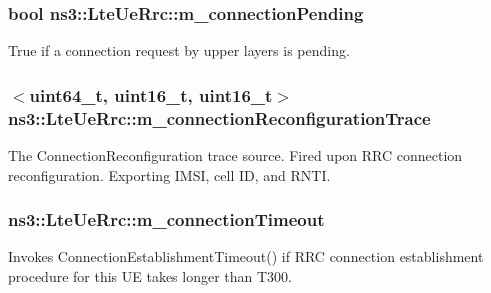 \subsubsection[{\texorpdfstring{m\+\_\+connection\+Pending}{m_connectionPending}}]{\setlength{\rightskip}{0pt plus 5cm}bool ns3\+::\+Lte\+Ue\+Rrc\+::m\+\_\+connection\+Pending\hspace{0.3cm}{\ttfamily [private]}}\hypertarget{classns3_1_1LteUeRrc_a0239d01e0235114cd7cdda22aff175ac}{}\label{classns3_1_1LteUeRrc_a0239d01e0235114cd7cdda22aff175ac}


True if a connection request by upper layers is pending. 

\subsubsection[{\texorpdfstring{m\+\_\+connection\+Reconfiguration\+Trace}{m_connectionReconfigurationTrace}}]{$<$uint64\+\_\+t, uint16\+\_\+t, uint16\+\_\+t$>$ ns3\+::\+Lte\+Ue\+Rrc\+::m\+\_\+connection\+Reconfiguration\+Trace\hspace{0.3cm}{\ttfamily [private]}}\hypertarget{classns3_1_1LteUeRrc_a97006f431abc80ea1809e7b50ca82c86}{}\label{classns3_1_1LteUeRrc_a97006f431abc80ea1809e7b50ca82c86}
The {\ttfamily Connection\+Reconfiguration} trace source. Fired upon R\+RC connection reconfiguration. Exporting I\+M\+SI, cell ID, and R\+N\+TI. 
\subsubsection[{\texorpdfstring{m\+\_\+connection\+Timeout}{m_connectionTimeout}}]{ ns3\+::\+Lte\+Ue\+Rrc\+::m\+\_\+connection\+Timeout\hspace{0.3cm}{\ttfamily [private]}}\hypertarget{classns3_1_1LteUeRrc_ab8f41a26e439cf7619c04ef4950d5f9f}{}\label{classns3_1_1LteUeRrc_ab8f41a26e439cf7619c04ef4950d5f9f}


Invokes Connection\+Establishment\+Timeout() if R\+RC connection establishment procedure for this UE takes longer than T300. 


